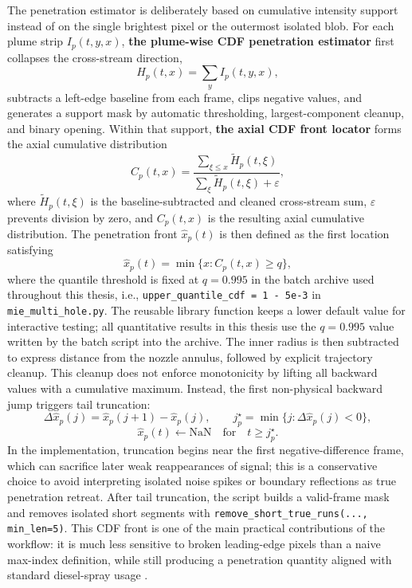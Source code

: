 \documentclass[english, 12pt, a4paper, elec, utf8, a-2b, online]{aaltothesis}
\DeclareRobustCommand{\codepath}[1]{\nolinkurl{#1}}
\begin{document}
The penetration estimator is deliberately based on cumulative intensity support instead of on the single brightest pixel or the outermost isolated blob. For each plume strip \(I_p(t,y,x)\), \textbf{the plume-wise CDF penetration estimator} first collapses the cross-stream direction,
\[
H_p(t,x)=\sum_y I_p(t,y,x),
\]
subtracts a left-edge baseline from each frame, clips negative values, and generates a support mask by automatic thresholding, largest-component cleanup, and binary opening. Within that support, \textbf{the axial CDF front locator} forms the axial cumulative distribution
\[
C_p(t,x)=\frac{\sum_{\xi \le x} \tilde{H}_p(t,\xi)}{\sum_{\xi} \tilde{H}_p(t,\xi)+\varepsilon},
\]
where \(\tilde{H}_p(t,\xi)\) is the baseline-subtracted and cleaned cross-stream sum, \(\varepsilon\) prevents division by zero, and \(C_p(t,x)\) is the resulting axial cumulative distribution. The penetration front \(\hat{x}_p(t)\) is then defined as the first location satisfying
\[
\hat{x}_p(t)=\min \{x : C_p(t,x)\ge q\},
\]
where the quantile threshold is fixed at \(q=0.995\) in the batch archive used throughout this thesis, i.e., \texttt{upper\_quantile\_cdf = 1 - 5e-3} in \codepath{mie\_multi\_hole.py}. The reusable library function keeps a lower default value for interactive testing; all quantitative results in this thesis use the \(q=0.995\) value written by the batch script into the archive. The inner radius is then subtracted to express distance from the nozzle annulus, followed by explicit trajectory cleanup. This cleanup does not enforce monotonicity by lifting all backward values with a cumulative maximum. Instead, the first non-physical backward jump triggers tail truncation:
\[
\Delta \hat{x}_p(j)=\hat{x}_p(j+1)-\hat{x}_p(j),\qquad
j_p^\star=\min\{j:\Delta \hat{x}_p(j)<0\},
\]
\[
\hat{x}_p(t)\leftarrow \mathrm{NaN}\quad \text{for}\quad t\ge j_p^\star .
\]
In the implementation, truncation begins near the first negative-difference frame, which can sacrifice later weak reappearances of signal; this is a conservative choice to avoid interpreting isolated noise spikes or boundary reflections as true penetration retreat. After tail truncation, the script builds a valid-frame mask and removes isolated short segments with \texttt{remove\_short\_true\_runs(..., min\_len=5)}. This CDF front is one of the main practical contributions of the workflow: it is much less sensitive to broken leading-edge pixels than a naive max-index definition, while still producing a penetration quantity aligned with standard diesel-spray usage \cite{Dent1971Penetration,HiroyasuArai1990,NaberSiebers1996}.
\end{document}
